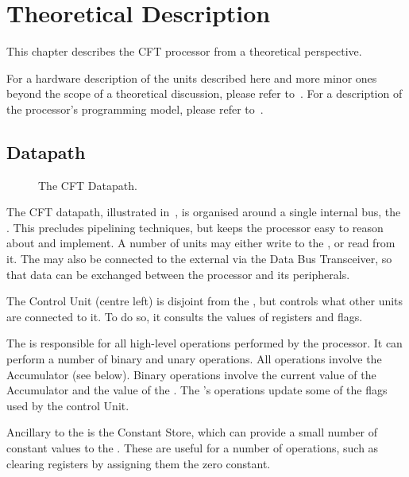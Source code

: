 \chapter{Theoretical Description}

This chapter describes the CFT processor from a theoretical
perspective.

For a hardware description of the units described here and more minor ones
beyond the scope of a theoretical discussion, please refer
to~. For a description of the
processor's programming model, please refer to~.


\section{Datapath}

\begin{figure}
\caption[CFT Datapath]{\label{fig:datapath} The CFT Datapath. }
\end{figure}

The CFT datapath, illustrated in~, is organised around a
single internal bus, the \IBUS{}. This precludes pipelining techniques, but keeps
the processor easy to reason about and implement. A number of units may either
write to the \IBUS{}, or read from it. The \IBUS{} may also be connected to the
external \DBUS{} via the Data Bus Transceiver, so that data can be exchanged
between the processor and its peripherals.

The Control Unit (centre left) is disjoint from the \IBUS{}, but controls what
other units are connected to it. To do so, it consults the values of registers
and flags.

The \ALU{} is responsible for all high-level operations performed by
the processor. It can perform a number of binary and unary
operations. All operations involve the \gls{Accumulator} (see below). Binary
operations involve the current value of the \gls{Accumulator} and the value
of the \IBUS{}. The \ALU's operations update some of the flags used by
the control Unit.

Ancillary to the \ALU{} is the Constant Store, which can provide a small
number of constant values to the \IBUS{}. These are useful for a number of
operations, such as clearing registers by assigning them the zero constant.

